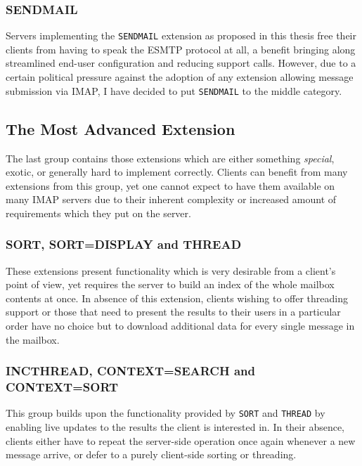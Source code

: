 \documentclass[trojita]{subfiles}
\begin{document}
\subsubsection{SENDMAIL}

Servers implementing the {\tt SENDMAIL} extension as proposed in this thesis free their clients from having to speak the
ESMTP protocol at all, a benefit bringing along streamlined end-user configuration and reducing support calls.  However,
due to a certain political pressure against the adoption of any extension allowing message submission via IMAP, I have
decided to put {\tt SENDMAIL} to the middle category.

\subsection{The Most Advanced Extension}

The last group contains those extensions which are either something {\em special}, exotic, or generally hard to
implement correctly.  Clients can benefit from many extensions from this group, yet one cannot expect to have them
available on many IMAP servers due to their inherent complexity or increased amount of requirements which they put on
the server.

\subsubsection{SORT, SORT=DISPLAY and THREAD}

These extensions present functionality which is very desirable from a client's point of view, yet requires the server to
build an index of the whole mailbox contents at once.  In absence of this extension, clients wishing to offer threading
support or those that need to present the results to their users in a particular order have no choice but to download
additional data for every single message in the mailbox.

\subsubsection{INCTHREAD, CONTEXT=SEARCH and CONTEXT=SORT}

This group builds upon the functionality provided by {\tt SORT} and {\tt THREAD} by enabling live updates to the results
the client is interested in.  In their absence, clients either have to repeat the server-side operation once again
whenever a new message arrive, or defer to a purely client-side sorting or threading.
\end{document}
